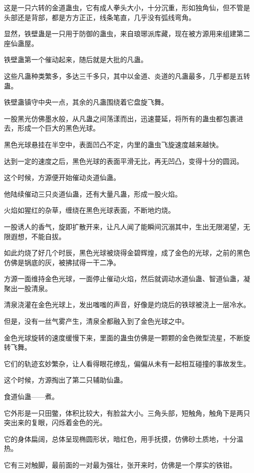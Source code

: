 \begin{this_body}
这是一只六转的金道蛊虫，它有成人拳头大小，十分沉重，形如独角仙，但不管是头部还是背部，都是方方正正，线条笔直，几乎没有弧线弯角。

显然，铁壁蛊是一只用于防御的蛊虫，来自琅琊派库藏，现在被方源用来组建第二座仙蛊屋。

铁壁蛊第一个催动起来，随后就是大批的凡蛊。

这些凡蛊种类繁多，多达三千多只，其中以金道、炎道的凡蛊最多，几乎都是五转蛊。

铁壁蛊镇守中央一点，其余的凡蛊围绕着它盘旋飞舞。

一股黑光仿佛墨水般，从凡蛊之间荡漾而出，迅速蔓延，将所有的蛊虫都包裹进去，形成一个巨大的黑色光球。

黑色光球悬挂在半空中，表面凹凸不定，内里的蛊虫飞旋速度越来越快。

达到一定的速度之后，黑色光球的表面平滑无比，再无凹凸，变得十分的圆润。

这个时候，方源便开始催动炎道仙蛊。

他陆续催动三只炎道仙蛊，还有大量凡蛊，形成一股火焰。

火焰如猩红的杂草，缠绕在黑色光球表面，不断地灼烧。

一股诱人的香气，旋即扩散开来，让凡人闻了能瞬间沉溺其中，生出无限渴望，无限遐想，不能自拔。

如此灼烧了好几个时辰，黑色光球被烧得金碧辉煌，成了金色的光球，之前的黑色仿佛是锅底的灰，被拂拭得一干二净。

方源一面维持金色光球，一面停止催动火焰，然后就调动水道仙蛊、智道仙蛊，凝聚出一股清泉。

清泉浇灌在金色光球上，发出嗤嗤的声音，好像是灼烧后的铁球被浇上一层冷水。

但是，没有一丝气雾产生，清泉全都融入到了金色光球之中。

金色光球旋转的速度缓慢下来，里面的蛊虫仿佛是一颗颗的金色微型流星，不断旋转飞舞。

它们的轨迹玄妙繁杂，让人看得眼花缭乱，偏偏从未有一起相互碰撞的事故发生。

这个时候，方源掏出了第二只辅助仙蛊。

食道仙蛊——煮。

它外形是一只田鳖，体积比较大，有脸盆大小。三角头部，短触角，触角下是两只突出来的复眼，闪烁着金色的光。

它的身体扁阔，总体呈现椭圆形状，暗红色，用手抚摸，仿佛砂土质地，十分温热。

它有三对触脚，最前面的一对最为强壮，张开来时，仿佛是一个厚实的铁钳。


\end{this_body}
